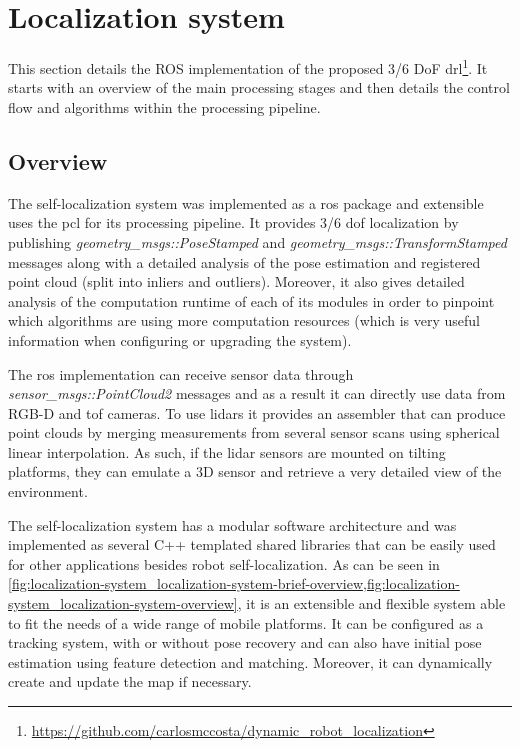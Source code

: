 \section{Localization system}\label{sec:localization-system}

This section details the ROS implementation of the proposed 3/6 DoF \gls{drl}\footnote{\url{https://github.com/carlosmccosta/dynamic_robot_localization}}. It starts with an overview of the main processing stages and then details the control flow and algorithms within the processing pipeline.

\subsection{Overview}

The self-localization system was implemented as a \gls{ros} package and extensible uses the \gls{pcl} \cite{Rusu2011} for its processing pipeline. It provides 3/6 \gls{dof} localization by publishing \emph{geometry\_msgs::PoseStamped} and \emph{geometry\_msgs::TransformStamped} messages along with a detailed analysis of the pose estimation and registered point cloud (split into inliers and outliers). Moreover, it also gives detailed analysis of the computation runtime of each of its modules in order to pinpoint which algorithms are using more computation resources (which is very useful information when configuring or upgrading the system).

The \gls{ros} implementation can receive sensor data through \emph{sensor\_msgs::PointCloud2} messages and as a result it can directly use data from RGB-D and \gls{tof} cameras. To use \glspl{lidar} it provides an assembler that can produce point clouds by merging measurements from several sensor scans using spherical linear interpolation. As such, if the \gls{lidar} sensors are mounted on tilting platforms, they can emulate a 3D sensor and retrieve a very detailed view of the environment.

The self-localization system has a modular software architecture and was implemented as several C++ templated shared libraries that can be easily used for other applications besides robot self-localization. As can be seen in \cref{fig:localization-system_localization-system-brief-overview,fig:localization-system_localization-system-overview}, it is an extensible and flexible system able to fit the needs of a wide range of mobile platforms. It can be configured as a tracking system, with or without pose recovery and can also have initial pose estimation using feature detection and matching. Moreover, it can dynamically create and update the map if necessary.

